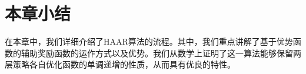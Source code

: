 \section{本章小结}
在本章中，我们详细介绍了HAAR算法的流程。其中，我们重点讲解了基于优势函数的辅助奖励函数的运作方式以及优势。我们从数学上证明了这一算法能够保留两层策略各自优化函数的单调递增的性质，从而具有优良的特性。
%
%
%
%
%
